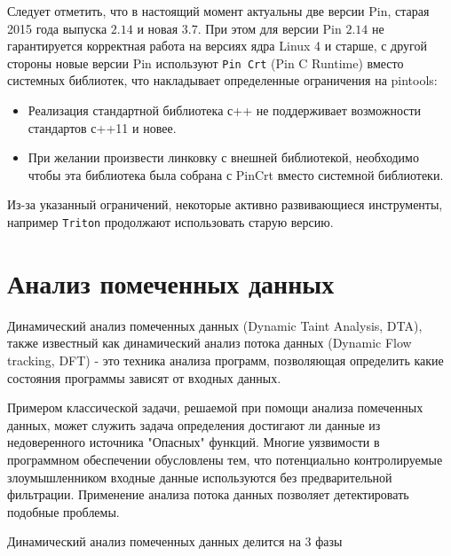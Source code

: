 Следует отметить, что в настоящий момент актуальны две версии Pin, старая 2015 года выпуска $2.14$ и новая $3.7$. При этом для версии Pin $2.14$ не гарантируется корректная работа на версиях ядра Linux 4 и старше, с другой стороны новые версии Pin используют \texttt{Pin Crt} (Pin C Runtime) вместо системных библиотек, что накладывает определенные ограничения на pintools:

\begin{itemize}
    \item Реализация стандартной библиотека с++ не поддерживает возможности стандартов с++11 и новее.
    \item При желании произвести линковку с внешней библиотекой, необходимо чтобы эта библиотека была собрана с PinCrt вместо системной библиотеки.
\end{itemize}

Из-за указанный ограничений, некоторые активно развивающиеся инструменты, например \texttt{Triton} продолжают использовать старую версию.

\section{Анализ помеченных данных}

Динамический анализ помеченных данных (Dynamic Taint Analysis, DTA), также известный как динамический анализ потока данных (Dynamic Flow tracking, DFT) - это техника анализа программ, позволяющая определить какие состояния программы зависят от входных данных.

Примером классической задачи, решаемой при помощи анализа помеченных данных, может служить задача определения достигают ли данные из недоверенного источника "Опасных" функций. Многие уязвимости в программном обеспечении обусловлены тем, что потенциально контролируемые злоумышленником входные данные используются без предварительной фильтрации. Применение анализа потока данных позволяет детектировать подобные проблемы.

Динамический анализ помеченных данных делится на 3 фазы

